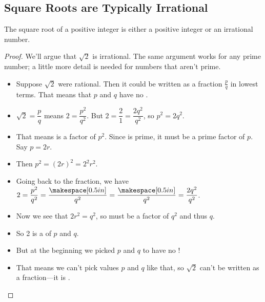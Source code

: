 \subsection{Square Roots are Typically Irrational} 
\begin{theorem}
The square root of a positive integer is either a positive integer or an irrational number.
\end{theorem}
\begin{proof}
We'll argue that $\sqrt{2}$ is irrational. The same argument works for any prime number; a little more detail is needed for numbers that aren't prime.
\begin{itemize}
\item Suppose $\sqrt{2}$ were rational. Then it could be written as a fraction $\frac{p}{q}$ in lowest terms. That means that $p$ and $q$ have no \makeblank.
\item $\sqrt{2}=\dfrac{p}{q}$ means $2=\dfrac{p^2}{q^2}$. But $2=\dfrac{2}{1}=\dfrac{2q^2}{q^2}$, so $p^2=2q^2$.
\item That means \makeblanksmall is a factor of $p^2$. Since \makeblanksmall is prime, it must be a prime factor of $p$. Say $p=2r$.
\item Then $p^2=(2r)^2=2^2r^2$.
\item Going back to the fraction, we have $2=\dfrac{p^2}{q^2}=\dfrac{\makespace[0.5in]}{q^2}=\dfrac{\makespace[0.5in]}{q^2}=\dfrac{2q^2}{q^2}$.
\item Now we see that $2r^2=q^2$, so \makeblanksmall must be a factor of $q^2$ and thus $q$.
\item So 2 is a \makeblank[1.75in] of $p$ and $q$.
\item But at the beginning we picked $p$ and $q$ to have no \makeblank[1.75in]!
\item That means we can't pick values $p$ and $q$ like that, so $\sqrt{2}$ can't be written as a fraction---it is \makeblank.\qedhere
\end{itemize}
\end{proof}